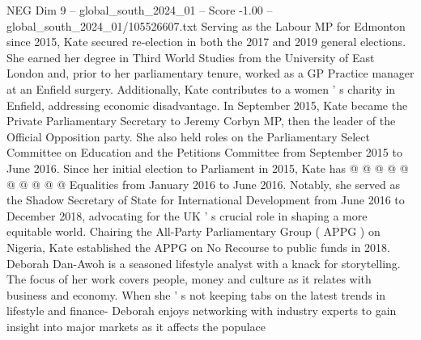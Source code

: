 \begin{textsample}{NEG Dim 9 – global\_south\_2024\_01 – Score -1.00 – global\_south\_2024\_01/105526607.txt}
Serving as the Labour MP for Edmonton since 2015, Kate secured re-election in both the 2017 and 2019 general elections.
She earned her degree in Third World Studies from the University of East London and, prior to her parliamentary tenure, worked as a GP Practice manager at an Enfield surgery.
Additionally, Kate contributes to a women ' s charity in Enfield, addressing economic disadvantage.
In September 2015, Kate became the Private Parliamentary Secretary to Jeremy Corbyn MP, then the leader of the Official Opposition party.
She also held roles on the Parliamentary Select Committee on Education and the Petitions Committee from September 2015 to June 2016.
Since her initial election to Parliament in 2015, Kate has @ @ @ @ @ @ @ @ @ @ Equalities from January 2016 to June 2016.
Notably, she served as the Shadow Secretary of State for International Development from June 2016 to December 2018, advocating for the UK ' s crucial role in shaping a more equitable world.
Chairing the All-Party Parliamentary Group ( APPG ) on Nigeria, Kate established the APPG on No Recourse to public funds in 2018.
Deborah Dan-Awoh is a seasoned lifestyle analyst with a knack for storytelling.
The focus of her work covers people, money and culture as it relates with business and economy.
When she ' s not keeping tabs on the latest trends in lifestyle and finance- Deborah enjoys networking with industry experts to gain insight into major markets as it affects the populace

\end{textsample}
